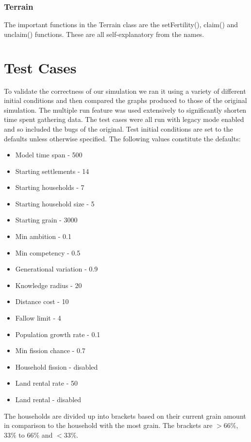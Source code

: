 \documentclass[12pt]{article}
\begin{document}
			\subsubsection{Terrain}
				The important functions in the Terrain class are the setFertility(), claim() and unclaim() functions. These are all self-explanatory from the names.
	
	\section{Test Cases}
		To validate the correctness of our simulation we ran it using a variety of different initial conditions and then compared the graphs produced to those of the original simulation. The multiple run feature was used extensively to significantly shorten time spent gathering data. The test cases were all run with legacy mode enabled and so included the bugs of the original. Test initial conditions are set to the defaults unless otherwise specified. The following values constitute the defaults:\\
		\begin{itemize}
			\itemsep-0.5em 
			\item Model time span - 500
			\item Starting settlements - 14
			\item Starting households - 7
			\item Starting household size  - 5
			\item Starting grain - 3000
			\item Min ambition - 0.1
			\item Min competency - 0.5
			\item Generational variation - 0.9
			\item Knowledge radius - 20
			\item Distance cost - 10
			\item Fallow limit - 4
			\item Population growth rate - 0.1
			\item Min fission chance - 0.7
			\item Household fission - disabled
			\item Land rental rate - 50
			\item Land rental - disabled
		\end{itemize}
		
		The households are divided up into brackets based on their current grain amount in comparison to the household with the most grain. The brackets are $>66\%$, $33\%$ to $66\%$ and $<33\%$.
		
\end{document}
